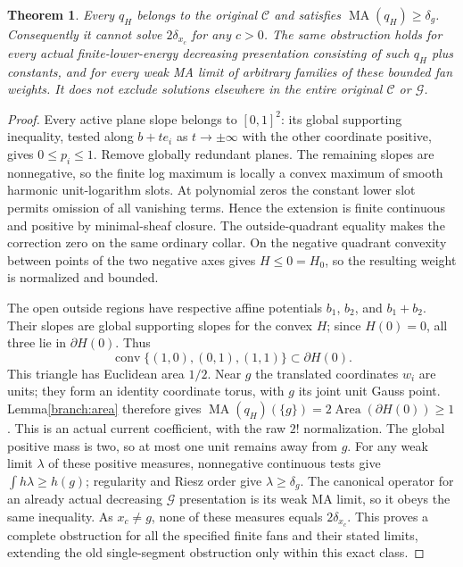 \documentclass[11pt]{article}
\newtheorem{theorem}{Theorem}
\newcommand{\MA}{\operatorname{MA}}
\newcommand{\C}{\mathcal C}
\begin{document}
\begin{theorem}\label{branch:fanobstruction}
Every $q_H$ belongs to the original $\C$ and satisfies
$\MA(q_H)\ge\delta_g$. Consequently it cannot solve $2\delta_{x_c}$
for any $c>0$. The same obstruction holds for every actual
finite-lower-energy decreasing presentation consisting of such $q_H$
plus constants, and for every weak MA limit of arbitrary families of
these bounded fan weights. It does not exclude solutions elsewhere in
the entire original $\C$ or $\mathcal G$.
\end{theorem}
\begin{proof}
Every active plane slope belongs to $[0,1]^2$: its global supporting
inequality, tested along $b+t e_i$ as $t\to\pm\infty$ with the other
coordinate positive, gives $0\le p_i\le1$. Remove globally redundant
planes. The remaining slopes are nonnegative, so the finite log maximum
is locally a convex maximum of smooth harmonic unit-logarithm slots.
At polynomial zeros the constant lower slot permits omission of all
vanishing terms. Hence the extension is finite continuous and positive
by minimal-sheaf closure. The outside-quadrant equality makes the correction
zero on the same ordinary collar. On the negative quadrant convexity
between points of the two negative axes gives $H\le0=H_0$, so the resulting
weight is normalized and bounded.

The open outside regions have respective affine potentials $b_1$, $b_2$,
and $b_1+b_2$. Their slopes are global supporting slopes for the convex
$H$; since $H(0)=0$, all three lie in $\partial H(0)$. Thus
\[
 \operatorname{conv}\{(1,0),(0,1),(1,1)\}\subset\partial H(0).
\]
This triangle has Euclidean area $1/2$. Near $g$ the translated coordinates
$w_i$ are units; they form an identity coordinate torus, with $g$ its joint
unit Gauss point. Lemma\ref{branch:area} therefore gives
$\MA(q_H)(\{g\})=2\operatorname{Area}(\partial H(0))\ge1$.
This is an actual current coefficient, with the raw $2!$ normalization.
The global positive mass is two, so at most one unit remains away from $g$.
For any weak limit $\lambda$ of these positive measures, nonnegative
continuous tests give $\int h\lambda\ge h(g)$; regularity and Riesz order
give $\lambda\ge\delta_g$. The canonical operator for an already actual
decreasing $\mathcal G$ presentation is its weak MA limit, so it obeys the
same inequality. As $x_c\ne g$, none of these measures equals $2\delta_{x_c}$.
This proves a complete obstruction for all the specified finite fans and
their stated limits, extending the old single-segment obstruction only
within this exact class.
\end{proof}
\end{document}
